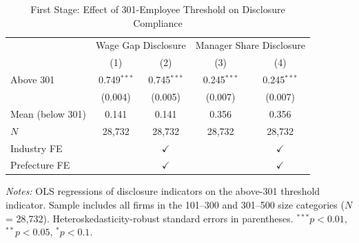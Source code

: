 \begin{table}[t]
\centering
\caption{First Stage: Effect of 301-Employee Threshold on Disclosure Compliance}
\label{tab:first_stage}
\begin{tabular}{lcccc}
\hline\hline
 & \multicolumn{2}{c}{Wage Gap Disclosure} & \multicolumn{2}{c}{Manager Share Disclosure} \\
 & (1) & (2) & (3) & (4) \\
\hline
Above 301 & 0.749$^{***}$ & 0.745$^{***}$ & 0.245$^{***}$ & 0.245$^{***}$ \\
 & (0.004) & (0.005) & (0.007) & (0.007) \\
\hline
Mean (below 301) & 0.141 & 0.141 & 0.356 & 0.356 \\
$N$ & 28,732 & 28,732 & 28,732 & 28,732 \\
Industry FE & & $\checkmark$ & & $\checkmark$ \\
Prefecture FE & & $\checkmark$ & & $\checkmark$ \\
\hline\hline
\end{tabular}
\begin{tablenotes}\small
\item \textit{Notes:} OLS regressions of disclosure indicators on the above-301 threshold indicator. Sample includes all firms in the 101--300 and 301--500 size categories ($N$ = 28,732). Heteroskedasticity-robust standard errors in parentheses. $^{***}p<0.01$, $^{**}p<0.05$, $^{*}p<0.1$.
\end{tablenotes}
\end{table}


